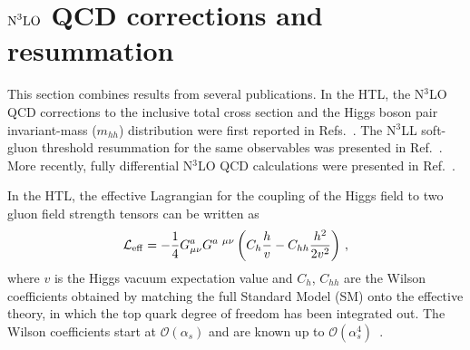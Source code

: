 \section[\texorpdfstring{$\textup{N}^3\textup{LO}$ QCD corrections and resummation}{N3LO QCD corrections and resummation}]{\texorpdfstring{\boldmath$\textup{N}^3\textup{LO}$ QCD corrections and resummation}{N3LO QCD corrections and resummation}}
\label{sec:n3lo-qcd}

This section combines results from several publications. In the HTL, the N$^3$LO QCD corrections to the inclusive total cross section and the Higgs boson pair invariant-mass ($m_{hh}$) distribution were first reported in Refs.~\cite{Chen:2019lzz, Chen:2019fhs}. The N$^3$LL soft-gluon threshold resummation for the same observables was presented in Ref.~\cite{Ajjath:2022kpv}. More recently, fully differential N$^3$LO QCD calculations were presented in Ref.~\cite{Chen:2026zmi}.

In the HTL, the effective Lagrangian for the
coupling of the Higgs field to two gluon field strength tensors
can be written as
\begin{align}\label{eq:effL}
 \mathcal{L}_{\rm eff}= -\frac{1}{4}  G_{\mu\nu}^a G^{a~\mu\nu}
 \left(
  C_{h} \frac{h}{v} - C_{hh} \frac{h^2}{2v^2}
 \right)\,,
\end{align}
where $v$ is the Higgs vacuum expectation value and
$C_h$, $C_{hh}$ are the Wilson coefficients obtained by matching the full Standard Model (SM) onto the effective theory, in which the top quark degree of freedom has been integrated out.
The Wilson coefficients start at $\mathcal{O}(\alpha_s)$ and are known up to $\mathcal{O}(\alpha_s^4)$~\cite{Inami:1982xt, Chetyrkin:1997iv, Chetyrkin:1997un, Schroder:2005hy, Chetyrkin:2005ia, Kniehl:2006bg,Baikov:2016tgj,Spira:2016zna,Gerlach:2018hen}.


